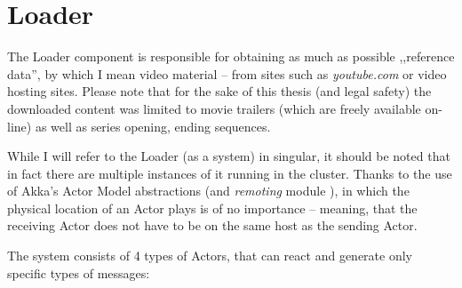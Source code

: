 \section{Loader}
The Loader component is responsible for obtaining as much as possible ,,reference data'', by which I mean video material -- from sites such as \textit{youtube.com} or video hosting sites. Please note that for the sake of this thesis (and legal safety) the downloaded content was limited to movie trailers (which are freely available on-line) as well as series opening, ending sequences.

While I will refer to the Loader (as a system) in singular, it should be noted that in fact there are multiple instances of it running in the cluster.
Thanks to the use of Akka's \cite{akka-docs} Actor Model abstractions (and \textit{remoting} module \cite{akka-remoting}), in which the physical location of an Actor plays is of no importance -- meaning, that the receiving Actor does not have to be on the same host as the sending Actor.

The system consists of 4 types of Actors, that can react and generate only specific types of messages:

